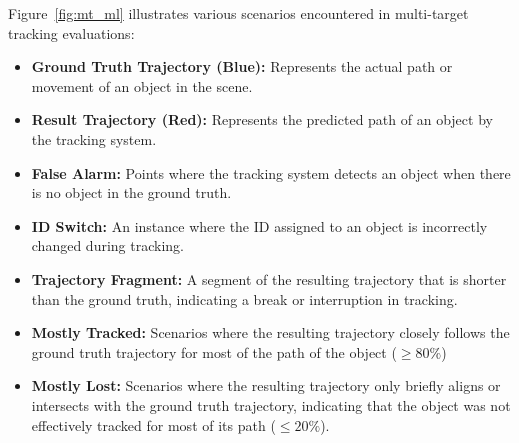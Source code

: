 Figure~\ref{fig:mt_ml} illustrates various scenarios encountered in multi-target tracking evaluations:

\begin{itemize}
    \item \textbf{Ground Truth Trajectory (Blue):} Represents the actual path or movement of an object in the scene.
    \item \textbf{Result Trajectory (Red):} Represents the predicted path of an object by the tracking system.
    \item \textbf{False Alarm:} Points where the tracking system detects an object when there is no object in the ground truth.
    \item \textbf{ID Switch:} An instance where the ID assigned to an object is incorrectly changed during tracking.
    \item \textbf{Trajectory Fragment:} A segment of the resulting trajectory that is shorter than the ground truth, indicating a break or interruption in tracking.
    \item \textbf{Mostly Tracked:} Scenarios where the resulting trajectory closely follows the ground truth trajectory for most of the path of the object (\(\geq 80\%\))
    \item \textbf{Mostly Lost:} Scenarios where the resulting trajectory only briefly aligns or intersects with the ground truth trajectory, indicating that the object was not effectively tracked for most of its path (\(\leq 20\%\)).
\end{itemize}